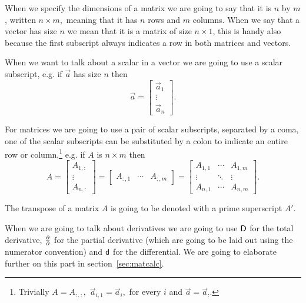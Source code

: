 \documentclass{sapthesis}
\begin{document}
When we specify the dimensions of a matrix we are going to say that it is \(n\)
by \(m\), written \(n \times m,\) meaning that it has \(n\) rows and \(m\)
columns.  When we say that a vector has size \(n\) we mean that it is a matrix
of size \(n \times 1\), this is handy also because the first subscript always
indicates a row in both matrices and vectors.

When we want to talk about a scalar in a vector we are going to use a scalar
subscript, e.g. if \(\vec a\) has size \(n\) then \[\vec a =
\left[\begin{array}{c} \vec a_1 \\ \vdots \\ \vec a_n \end{array}\right].\]

For matrices we are going to use a pair of scalar subscripts, separated by a
coma, one of the scalar subscripts can be substituted by a colon to indicate an
entire row or column,\footnote{Trivially \(A = A_{:,:},\) \(\vec a_{i,1} = \vec
a_i,\) for every \(i\) and \(\vec a = \vec a_:.\)} e.g.  if \(A\) is \(n \times
m\) then \[
    A
    = \left[\begin{array}{c}A_{1,:} \\ \vdots \\ A_{n,:}\end{array}\right]
    = [\begin{array}{ccc}A_{:,1} & \cdots & A_{:,m}\end{array}]
    = \left[\begin{array}{ccc}
        A_{1,1} & \cdots & A_{1,m} \\
        \vdots & \ddots & \vdots \\
        A_{n,1} & \cdots & A_{n,m}
    \end{array}\right].
\]

The transpose of a matrix \(A\) is going to be denoted with a prime superscript
\(A'\).

When we are going to talk about derivatives we are going to use \(\mathop{}\!\mathsf D\) for the
total derivative, \(\textstyle\frac{\partial\relax}{\partial\relax}\) for the partial derivative (which
are going to be laid out using the numerator convention) and \(\mathop{}\!\mathsf d\) for the
differential. We are going to elaborate further on this part in
section~\ref{sec:matcalc}.
\end{document}
